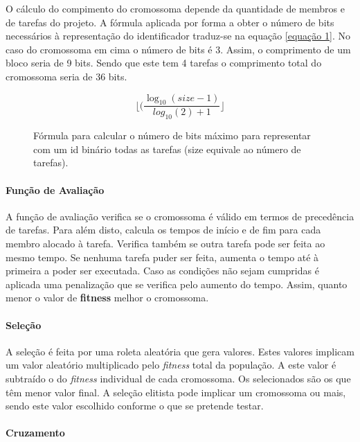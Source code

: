 \begin{titlepage}
O cálculo do compimento do cromossoma depende da quantidade de membros e de tarefas do projeto. A fórmula aplicada por forma a obter o número de bits necessários à representação do identificador traduz-se na equação \ref{equação 1}. No caso do cromossoma em cima o número de bits é 3. Assim, o comprimento de um bloco seria de 9 bits. Sendo que este tem 4 tarefas o comprimento total do cromossoma seria de 36 bits.

\begin{figure}[!ht]
\begin{equation} \label{equação 1}
\lfloor (\dfrac{\log_{10}(size-1)}{log_{10}(2)+1} \rfloor
\end{equation}
\caption{Fórmula para calcular o número de bits máximo para representar com um id binário todas as tarefas (size equivale ao número de tarefas).}
\end{figure}

\paragraph{Função de Avaliação}

A função de avaliação verifica se o cromossoma é válido em termos de precedência de tarefas. Para além disto, calcula os tempos de início e de fim para cada membro alocado à tarefa. Verifica também se outra tarefa pode ser feita ao mesmo tempo. Se nenhuma tarefa puder ser feita, aumenta o tempo até à primeira a poder ser executada. Caso as condições não sejam cumpridas é aplicada uma penalização que se verifica pelo aumento do tempo. Assim, quanto menor o valor de \textbf{fitness} melhor o cromossoma.

\paragraph{Seleção}

A seleção é feita por uma roleta aleatória que gera valores. Estes valores implicam um valor aleatório multiplicado pelo \textit{fitness} total da população. A este valor é subtraído o do \textit{fitness} individual de cada cromossoma. Os selecionados são os que têm menor valor final.  A seleção elitista pode implicar um cromossoma ou mais, sendo este valor escolhido conforme o que se pretende testar.

\paragraph{Cruzamento}


\end{titlepage}
